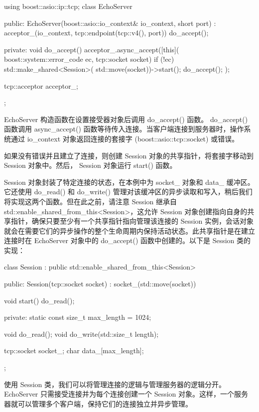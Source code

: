 \begin{cpp}
using boost::asio::ip::tcp;
class EchoServer {
public:
    EchoServer(boost::asio::io_context& io_context,
               short port)
        : acceptor_(io_context,
                    tcp::endpoint(tcp::v4(),
                    port)) {
        do_accept();
    }

private:
    void do_accept() {
        acceptor_.async_accept([this](
                    boost::system::error_code ec,
                    tcp::socket socket) {
            if (!ec) {
                std::make_shared<Session>(
                std::move(socket))->start();
            }
            do_accept();
        });
    }

    tcp::acceptor acceptor_;
};
\end{cpp}

EchoServer 构造函数在设置接受器对象后调用 do\_accept() 函数。 do\_accept() 函数调用 async\_accept() 函数等待传入连接。当客户端连接到服务器时，操作系统通过 io\_context 对象返回连接的套接字 (boost::asio::tcp::socket) 或错误。

如果没有错误并且建立了连接，则创建 Session 对象的共享指针，将套接字移动到 Session 对象中。然后， Session 对象运行 start() 函数。

Session 对象封装了特定连接的状态，在本例中为 socket\_ 对象和 data\_ 缓冲区。它还使用 do\_read() 和 do\_write() 管理对该缓冲区的异步读取和写入，稍后我们将实现这两个函数。但在此之前，请注意 Session 继承自 std::enable\_shared\_from\_this<Session>，这允许 Session 对象创建指向自身的共享指针，确保只要至少有一个共享指针指向管理该连接的 Session 实例，会话对象就会在需要它们的异步操作的整个生命周期内保持活动状态。此共享指针是在建立连接时在 EchoServer 对象中的 do\_accept() 函数中创建的。以下是 Session 类的实现：

\begin{cpp}
class Session
    : public std::enable_shared_from_this<Session>
{
public:
    Session(tcp::socket socket)
        : socket_(std::move(socket)) {}

    void start() { do_read(); }

private:
    static const size_t max_length = 1024;

    void do_read();
    void do_write(std::size_t length);

    tcp::socket socket_;
    char data_[max_length];
};
\end{cpp}

使用 Session 类，我们可以将管理连接的逻辑与管理服务器的逻辑分开。 EchoServer 只需接受连接并为每个连接创建一个 Session 对象。这样，一个服务器就可以管理多个客户端，保持它们的连接独立并异步管理。

